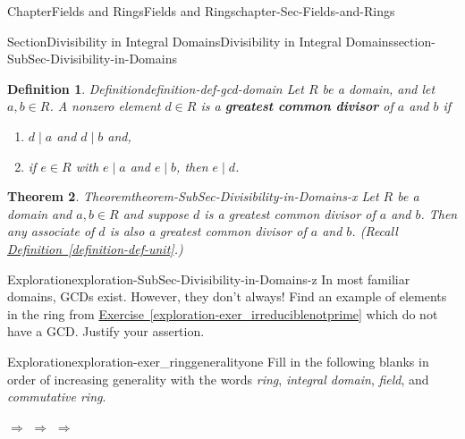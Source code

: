 \documentclass[oneside,10pt,]{book}
\newcommand{\xreffont}{\relax}
\newcommand{\terminology}[1]{\textbf{#1}}
\numberwithin{equation}{section}
\newtheorem{theorem}{Theorem}[section]
\newtheorem{definition}[theorem]{Definition}
\begin{document}
\begin{chapterptx}{Chapter}{Fields and Rings}{}{Fields and Rings}{}{}{chapter-Sec-Fields-and-Rings}
\begin{sectionptx}{Section}{Divisibility in Integral Domains}{}{Divisibility in Integral Domains}{}{}{section-SubSec-Divisibility-in-Domains}
\begin{definition}{Definition}{}{definition-def-gcd-domain}
Let \(R\) be a domain, and let \(a,b\in R\). A nonzero element \(d\in R\) is a \terminology{greatest common divisor} of \(a\) and \(b\) if%
\begin{enumerate}
\item{}\(d\mid a\) and \(d\mid b\) and,%
\item{}if \(e\in R\) with \(e\mid a\) and \(e\mid b\), then \(e\mid d\).%
\end{enumerate}
%
\end{definition}
\begin{theorem}{Theorem}{}{}{theorem-SubSec-Divisibility-in-Domains-x}%
Let \(R\) be a domain and \(a,b\in R\) and suppose \(d\) is a greatest common divisor of \(a\) and \(b\). Then any associate of \(d\) is also a greatest common divisor of \(a\) and \(b\). (Recall \hyperref[definition-def-unit]{Definition~{\xreffont\ref{definition-def-unit}}}.)%
\end{theorem}
\begin{exploration}{Exploration}{}{exploration-SubSec-Divisibility-in-Domains-z}%
In most familiar domains, GCDs exist. However, they don't always! Find an example of elements in the ring from \hyperref[exploration-exer_irreduciblenotprime]{Exercise~{\xreffont\ref{exploration-exer_irreduciblenotprime}}} which do not have a GCD. Justify your assertion.%
\end{exploration}%
\begin{exploration}{Exploration}{}{exploration-exer_ringgeneralityone}%
Fill in the following blanks in order of increasing generality with the words \emph{ring}, \emph{integral domain}, \emph{field}, and \emph{commutative ring}.%
\par
\textunderscore{}\textunderscore{}\textunderscore{}\textunderscore{}\textunderscore{}\textunderscore{}\textunderscore{}\textunderscore{}\textunderscore{}\textunderscore{} \(\Rightarrow\) \textunderscore{}\textunderscore{}\textunderscore{}\textunderscore{}\textunderscore{}\textunderscore{}\textunderscore{}\textunderscore{}\textunderscore{}\textunderscore{} \(\Rightarrow\) \textunderscore{}\textunderscore{}\textunderscore{}\textunderscore{}\textunderscore{}\textunderscore{}\textunderscore{}\textunderscore{}\textunderscore{}\textunderscore{} \(\Rightarrow\) \textunderscore{}\textunderscore{}\textunderscore{}\textunderscore{}\textunderscore{}\textunderscore{}\textunderscore{}\textunderscore{}\textunderscore{}\textunderscore{}%
\end{exploration}%
\end{sectionptx}
%
%
\typeout{************************************************}

\end{chapterptx}
\end{document}
